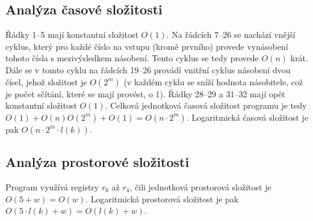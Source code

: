 \documentclass[10pt,a4paper]{article}
\begin{document}
\subsection*{Analýza časové složitosti}

Řádky 1--5 mají konstantní složitost $O(1)$. Na řádcích 7--26 se nachází vnější cyklus, který pro každé číslo na vstupu (kromě prvního) provede vynásobení tohoto čísla s mezivýsledkem násobení. Tento cyklus se tedy provede $O(n)$ krát. Dále se v tomto cyklu na řádcích 19--26 provádí vnitřní cyklus násobení dvou čísel, jehož složitost je $O(2^{m})$ (v každém cyklu se sníží hodnota násobitele, což je počet sčítání, které se mají provést, o 1). Řádky 28--29 a 31--32 mají opět konstantní složitost $O(1)$. Celková jednotková časová složitost programu je tedy $O(1) + O(n)O(2^{m}) + O(1) = O(n\cdot 2^{m})$. Logaritmická časová složitost je pak $O(n\cdot 2^{m}\cdot l(k))$.

\subsection*{Analýza prostorové složitosti}

Program využívá registry $r_{0}$ až $r_{4}$, čili jednotková prostorová složitost je $O(5 + w) = O(w)$. Logaritmická prostorová složitost je pak $O(5\cdot l(k) + w) = O(l(k) + w)$.
\end{document}
